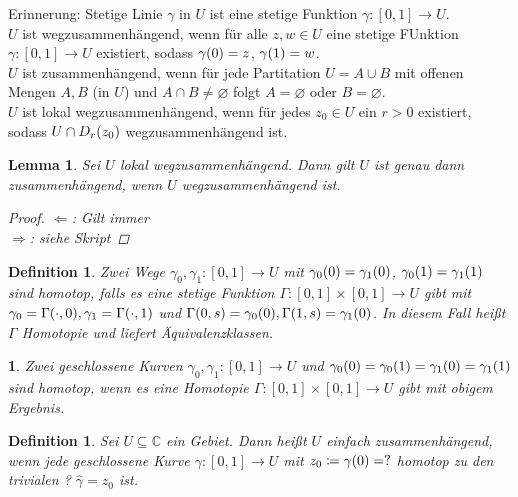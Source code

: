 \documentclass[11pt, a4paper]{article}
\theoremstyle{plain}
\newtheorem{definition}[blockelement]{Definition}
\newtheorem{lemma}[blockelement]{Lemma}
\newtheorem{genv}[blockelement]{}
\numberwithin{equation}{subsection}
\newcommand{\of}[1]{\mathopen{}\mathclose{}\bgroup\left(#1\aftergroup\egroup\right)}
\newcommand{\interv}[1]{\left[#1\right]}
\newcommand{\impl}[0]{\Rightarrow{}}
\renewcommand{\emptyset}{\varnothing}
\newcommand{\anf}[1]{\glqq{}#1\grqq}
\newcommand{\C}{\mathbb{C}}
\begin{document}
    Erinnerung: Stetige Linie $\gamma$ in $U$ ist eine stetige Funktion $\gamma: \interv{0,1}\to U$.\\
    $U$ ist wegzusammenhängend, wenn für alle $z, w\in U$ eine stetige FUnktion $\gamma: \interv{0,1} \to U$ existiert, sodass $\gamma\of{0} = z$, $\gamma\of{1} = w$.\\
    $U$ ist zusammenhängend, wenn für jede Partitation $U = A \cup B$ mit offenen Mengen $A, B$ (in $U$) und $A \cap B \neq \emptyset$ folgt $A = \emptyset$ oder $B = \emptyset$.\\
    $U$ ist lokal wegzusammenhängend, wenn für jedes $z_0\in U$ ein $r > 0$ existiert, sodass $U\cap D_r\of{z_0}$ wegzusammenhängend ist.

    \begin{lemma}
        Sei $U$ lokal wegzusammenhängend. Dann gilt $U$ ist genau dann zusammenhängend, wenn $U$ wegzusammenhängend ist.

        \begin{proof}
            \anf{$\Leftarrow$}: Gilt immer\\
            \anf{$\impl$}: siehe Skript
        \end{proof}
    \end{lemma}

    \begin{definition}
        Zwei Wege $\gamma_0, \gamma_1: \interv{0,1}\to U$ mit $\gamma_0\of{0} = \gamma_1\of{0}$, $\gamma_0\of{1} = \gamma_1\of{1}$ sind homotop, falls es eine stetige Funktion $\Gamma: \interv{0,1} \times \interv{0,1}\to U$ gibt mit $\gamma_0 = \Gamma\of{\cdot, 0}, \gamma_1 = \Gamma\of{\cdot, 1}$ und $\Gamma\of{0, s} = \gamma_0\of{0}, \Gamma\of{1, s} = \gamma_1\of{0}$. In diesem Fall heißt $\Gamma$ Homotopie und liefert Äquivalenzklassen.
    \end{definition}

    \begin{genv}
        Zwei geschlossene Kurven $\gamma_0, \gamma_1: \interv{0,1}\to U$ und $\gamma_0\of{0} = \gamma_0\of{1} = \gamma_1\of{0} = \gamma_1\of{1}$ sind homotop, wenn es eine Homotopie $\Gamma: \interv{0,1}\times\interv{0,1}\to U$ gibt mit obigem Ergebnis.
    \end{genv}

    \begin{definition}
        Sei $U\subseteq\C$ ein Gebiet. Dann heißt $U$ einfach zusammenhängend, wenn jede geschlossene Kurve $\gamma:\interv{0,1}\to U$ mit $z_0 \coloneqq \gamma\of{0} = ?$ homotop zu den trivialen ? $\hat{\gamma} = z_0$ ist.
    \end{definition}
\end{document}
